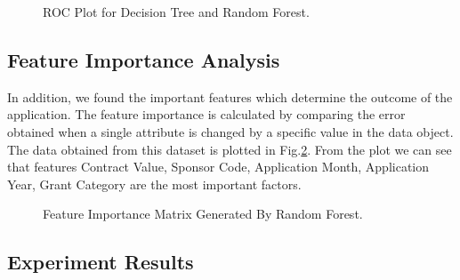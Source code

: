 \documentclass{article} %
\begin{document}
\begin{figure}[H]
\begin{center}
		\end{center}
		
		\caption{ROC Plot for Decision Tree and Random Forest.}
		\label{fig:ROCProbBin}
	\end{figure}
	
	\subsection{Feature Importance Analysis}
	In addition, we found the important features which determine the outcome of the application. The feature importance is calculated by comparing the error obtained when a single attribute is changed by a specific value in the data object. The data obtained from this dataset is plotted in Fig.\ref{fig:FIM}. From the plot we can see that features Contract Value, Sponsor Code, Application Month, Application Year, Grant Category are the most important factors.
	
	\begin{figure}[H]
		\begin{center}
		\end{center}
		\caption{Feature Importance Matrix Generated By Random Forest.}
		\label{fig:FIM}
	\end{figure} 
	
	\subsection{Experiment Results}
	
\end{document}
